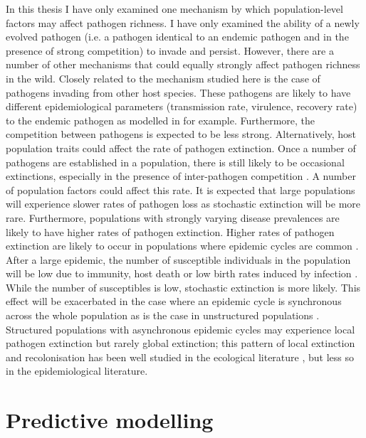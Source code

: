 In this thesis I have only examined one mechanism by which population-level factors may affect pathogen richness.
I have only examined the ability of a newly evolved pathogen (i.e. a pathogen identical to an endemic pathogen and in the presence of strong competition) to invade and persist.
However, there are a number of other mechanisms that could equally strongly affect pathogen richness in the wild.
Closely related to the mechanism studied here is the case of pathogens invading from other host species.
These pathogens are likely to have different epidemiological parameters (transmission rate, virulence, recovery rate) to the endemic pathogen as modelled in \textcite{may1994superinfection} for example.
Furthermore, the competition between pathogens is expected to be less strong.
Alternatively, host population traits could affect the rate of pathogen extinction.
Once a number of pathogens are established in a population, there is still likely to be occasional extinctions, especially in the presence of inter-pathogen competition \cite{kapusinszky2015local}. %
A number of population factors could affect this rate.
It is expected that large populations will experience slower rates of pathogen loss as stochastic extinction will be more rare.
Furthermore, populations with strongly varying disease prevalences are likely to have higher rates of pathogen extinction.
Higher rates of pathogen extinction are likely to occur in populations where epidemic cycles are common \cite{altizer2006sesonality}.
After a large epidemic, the number of susceptible individuals in the population will be low due to immunity, host death or low birth rates induced by infection \cite{scott1987population, hethcote1994thousand}.
While the number of susceptibles is low, stochastic extinction is more likely. %
This effect will be exacerbated in the case where an epidemic cycle is synchronous across the whole population as is the case in unstructured populations \cite{duke2011strong, mckenzie2001seasonality}.
Structured populations with asynchronous epidemic cycles may experience local pathogen extinction but rarely global extinction; this pattern of local extinction and recolonisation has been well studied in the ecological literature \cite{grenfell1995seasonality, levin1974dispersion, hanski1998metapopulation}, but less so in the epidemiological literature. %


\section{Predictive modelling}

